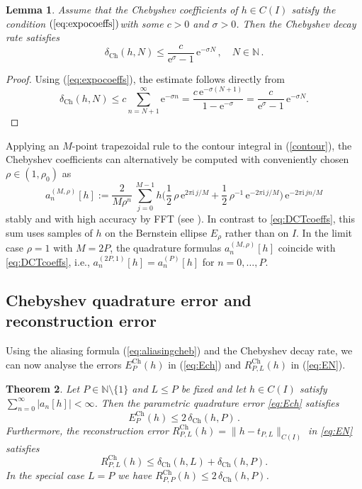\documentclass[11pt,a4paper]{scrartcl}
\newtheorem{theorem}{Theorem}[section]
\newtheorem{lemma}[theorem]{Lemma}
\numberwithin{equation}{section}
\numberwithin{table}{section}
\numberwithin{figure}{section}
\newcommand{\e}{\mathrm e}
\newcommand{\N}{\mathbb N}
\newcommand{\dch}{\delta_{\mathrm{Ch}}}
\newcommand{\Ech}{E^{\mathrm{Ch}}}
\newcommand{\Rch}{R^{\mathrm{Ch}}}
\begin{document}
\begin{lemma}
	\label{lem:Cexpodecay}
Assume that the Chebyshev coefficients of $h \in C(I)$ satisfy the condition
$(\ref{eq:expocoeffs})$with some $c>0$ and $\sigma>0$.
Then the Chebyshev decay rate satisfies
	$$
	\textstyle \dch(h,N) \leq \frac{c}{\e^{\sigma}-1}\,\e^{-\sigma N}\,, \quad N \in \N\,.
	$$
\end{lemma}
\begin{proof} Using (\ref{eq:expocoeffs}), the estimate follows directly from
$$  \textstyle \dch(h,N) \leq c\sum\limits_{n=N+1}^{\infty}\e^{-\sigma n}
=\frac{c\,\e^{-\sigma(N+1)}}{1-\e^{-\sigma}}
=\frac{c}{\e^{\sigma}-1}\,\e^{-\sigma N}.$$
\vspace*{-8mm}

\end{proof}

Applying an $M$-point trapezoidal rule to the contour integral in (\ref{contour}), the Chebyshev coefficients
can alternatively be computed 
with conveniently chosen $\rho \in (1, \rho_0)$ as
$$ \textstyle
a_n^{(M,\rho)}[h] :=\frac{2}{M \rho^n}\,\sum\limits_{j=0}^{M-1} h \big(\frac{1}{2} \, \rho \, {\mathrm e}^{2\pi {\mathrm i}\,j/M} + \frac{1}{2} \, \rho^{-1} \, {\mathrm e}^{-2\pi {\mathrm i}\,j/M}\big)\, {\mathrm e}^{-2\pi {\mathrm i}\,j n/M}
$$
stably and with high accuracy by FFT (see \cite{Wang17}). In contrast
to \eqref{eq:DCTcoeffs}, this sum uses samples of $h$ on the Bernstein ellipse $E_{\rho}$ rather than
on $I$. In the limit case $\rho = 1$ with $M = 2P$, the quadrature formulas $a_n^{(M,\rho)}[h]$ coincide with \eqref{eq:DCTcoeffs}, i.e., $a_n^{(2P,1)}[h] = a_n^{(P)}[h]$ for $n=0,\ldots,P$.

\subsection{Chebyshev quadrature error and reconstruction error}
\label{sec:Cerror}

Using the aliasing formula (\ref{eq:aliasingcheb}) and the Chebyshev decay rate, we can now analyse the errors
$\Ech_{P}(h)$ in (\ref{eq:Ech}) and  $\Rch_{P,L}(h)$ in (\ref{eq:EN}).

\begin{theorem}
	\label{Cor:Ech}
	Let $P \in \N \setminus \{1\}$ and $L \le P$ be fixed and let $h \in C(I)$ satisfy
	$\sum_{n=0}^{\infty}|a_n[h]| < \infty$. Then the parametric quadrature  error \eqref{eq:Ech}
	satisfies
	$$
	\Ech_{P}(h) \leq 2\,\dch(h,P)\,.
	$$
	Furthermore, the reconstruction error $\Rch_{P,L}(h) = \|h - t_{P,L}\|_{C(I)} $ in \eqref{eq:EN} satisfies
	\begin{equation}
		\label{eq:mainestimate}
		 \textstyle \Rch_{P,L}(h) \leq \dch(h,L) + \dch(h,P).
	\end{equation}
	 In the special case $L = P$ we have
	$\Rch_{P,P}(h) \leq 2\,\dch(h,P)$.
\end{theorem}
\end{document}
